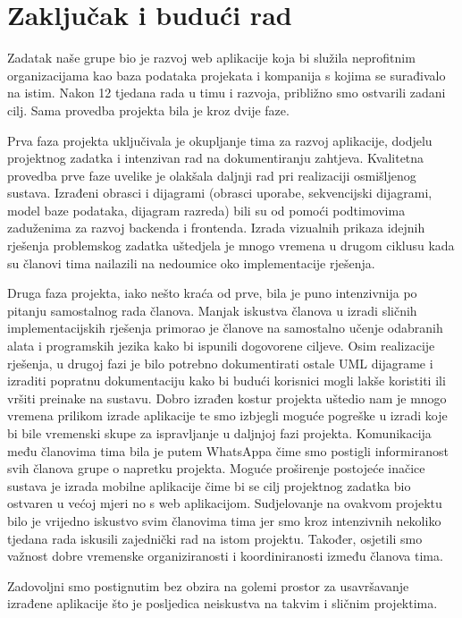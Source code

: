 \chapter{Zaključak i budući rad}
	
	
	

	{Zadatak naše grupe bio je razvoj web aplikacije koja bi služila neprofitnim organizacijama kao baza podataka projekata i kompanija s kojima se surađivalo na istim. Nakon 12 tjedana rada u timu i razvoja, približno smo ostvarili zadani cilj. Sama provedba projekta bila je kroz dvije faze.}

	{Prva faza projekta uključivala je okupljanje tima za razvoj aplikacije, dodjelu projektnog zadatka i intenzivan rad na dokumentiranju zahtjeva. Kvalitetna provedba prve faze uvelike je olakšala daljnji rad pri realizaciji osmišljenog sustava. Izrađeni obrasci i dijagrami (obrasci uporabe, sekvencijski dijagrami, model baze podataka, dijagram razreda) bili su od pomoći podtimovima zaduženima za razvoj backenda i frontenda. Izrada vizualnih prikaza idejnih rješenja problemskog zadatka uštedjela je mnogo vremena u drugom ciklusu kada su članovi tima nailazili na nedoumice oko implementacije rješenja.}

	{Druga faza projekta, iako nešto kraća od prve, bila je puno intenzivnija po pitanju samostalnog rada članova. Manjak iskustva članova u izradi sličnih implementacijskih rješenja primorao je članove na samostalno učenje odabranih alata i programskih jezika kako bi ispunili dogovorene ciljeve. Osim realizacije rješenja, u drugoj fazi je bilo potrebno dokumentirati ostale UML dijagrame i izraditi popratnu dokumentaciju kako bi budući korisnici mogli lakše koristiti ili vršiti preinake na sustavu. Dobro izrađen kostur projekta uštedio nam je mnogo vremena prilikom izrade aplikacije te smo izbjegli moguće pogreške u izradi koje bi bile vremenski skupe za ispravljanje u daljnjoj fazi projekta. Komunikacija među članovima tima bila je putem WhatsAppa čime smo postigli informiranost svih članova grupe o napretku projekta. Moguće proširenje postojeće inačice sustava je izrada mobilne aplikacije čime bi se cilj projektnog zadatka bio ostvaren u većoj mjeri no s web aplikacijom. Sudjelovanje na ovakvom projektu bilo je vrijedno iskustvo svim članovima tima jer smo kroz intenzivnih nekoliko tjedana rada iskusili zajednički rad na istom projektu. Također, osjetili smo važnost dobre vremenske organiziranosti i koordiniranosti između članova tima.}
	
	{Zadovoljni smo postignutim bez obzira na golemi prostor za usavršavanje izrađene aplikacije što je posljedica neiskustva na takvim i sličnim projektima.}
	
	\eject